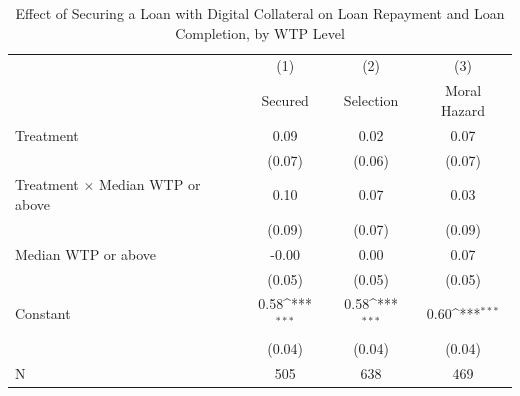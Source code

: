 \begin{table}[htbp]\centering
\def\sym#1{\ifmmode^{#1}\else\(^{#1}\)\fi}
\caption{Effect of Securing a Loan with Digital Collateral on Loan Repayment and Loan Completion, by WTP Level\label{LASMH\_repay\_wtpinteract\_LATE}}
\begin{tabular}{l*{3}{c}}
\toprule
                    &\multicolumn{1}{c}{(1)}&\multicolumn{1}{c}{(2)}&\multicolumn{1}{c}{(3)}\\
                    &\multicolumn{1}{c}{Secured}&\multicolumn{1}{c}{Selection}&\multicolumn{1}{c}{Moral Hazard}\\
\midrule
Treatment           &        0.09         &        0.02         &        0.07         \\
                    &      (0.07)         &      (0.06)         &      (0.07)         \\\addlinespace
Treatment $\times$ Median WTP or above&        0.10         &        0.07         &        0.03         \\
                    &      (0.09)         &      (0.07)         &      (0.09)         \\\addlinespace
Median WTP or above &       -0.00         &        0.00         &        0.07         \\
                    &      (0.05)         &      (0.05)         &      (0.05)         \\\addlinespace
Constant            &        0.58\sym{***}&        0.58\sym{***}&        0.60\sym{***}\\
                    &      (0.04)         &      (0.04)         &      (0.04)         \\\addlinespace
\midrule
N                   &         505         &         638         &         469         \\
\bottomrule
\end{tabular}
\end{table}
